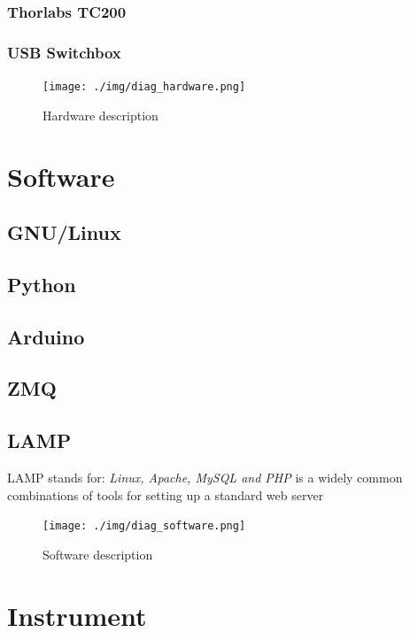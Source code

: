 \documentclass[master,       %
               twoside,        %
               BCOR10mm,       %
               ngerman,english  %
               ]{GAUBM_astro}
\begin{document}
\subsubsection{Thorlabs TC200}
\subsubsection{USB Switchbox}

\begin{center}
 \begin{figure}[h!]
 \centering
 \texttt{[image: ./img/diag\_hardware.png]}
 \caption{Hardware description}
 \label{fig:diag_hardware}
\end{figure}
\end{center}



\section{Software}
\subsection{GNU/Linux}
\subsection{Python}
\subsection{Arduino}
\subsection{ZMQ}
\subsection{LAMP}
LAMP stands for: \emph{Linux, Apache, MySQL and PHP} is a widely common combinations of tools for setting up a standard 
web server
\begin{center}
 \begin{figure}[h!]
 \centering
 \texttt{[image: ./img/diag\_software.png]}
 \caption{Software description}
 \label{fig:diag_software}
\end{figure}
\end{center}
\section{Instrument}
\end{document}
